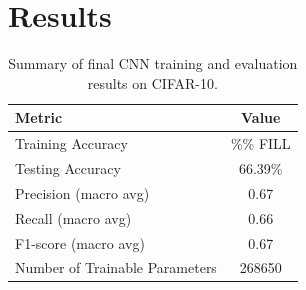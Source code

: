 \documentclass[11pt]{article}
\begin{document}
\section{Results}


\begin{table}[H]
    \centering
    \begin{tabular}{|l|c|}
        \hline
        \textbf{Metric} & \textbf{Value} \\ \hline
        Training Accuracy & \%\% FILL \\ \hline
        Testing Accuracy & 66.39\% \\ \hline
        Precision (macro avg) & 0.67 \\ \hline
        Recall (macro avg) & 0.66 \\ \hline
        F1-score (macro avg) & 0.67 \\ \hline
        Number of Trainable Parameters & 268650  \\ \hline
    \end{tabular}
    \caption{Summary of final CNN training and evaluation results on CIFAR-10.}
\end{table}

\end{document}
